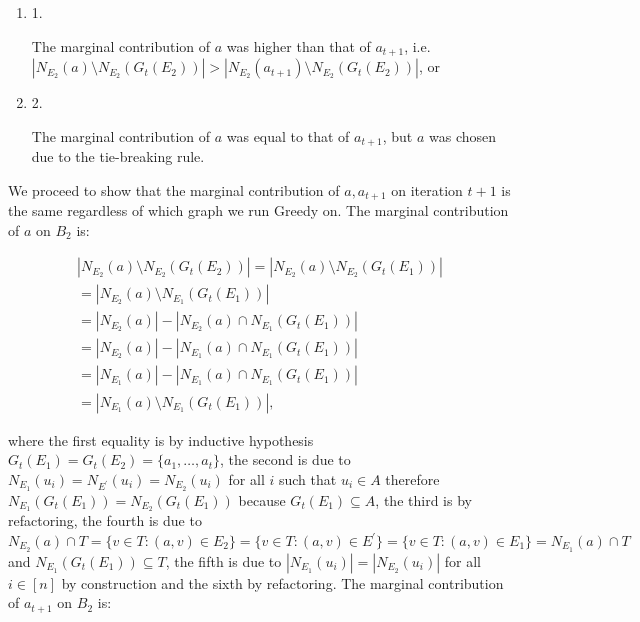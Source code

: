 \documentclass[10pt,a4paper]{article}
\begin{document}
\begin{enumerate}


\item[] 1. 


The marginal contribution of $a$ was higher than that of $a_{t+1}$, i.e. $|N_{E_{2}}(a)\setminus N_{E_{2}}(G_{t}(E_{2}))|>|N_{E_{2}}(a_{t+1})\setminus N_{E_{2}}(G_{t}(E_{2}))|$, or\par




\item[] 2. 


The marginal contribution of $a$ was equal to that of $a_{t+1}$, but $a$ was chosen due to the tie-breaking rule.\par




\end{enumerate}


We proceed to show that the marginal contribution of $a,a_{t+1}$ on iteration $t+1$ is the same regardless of which graph we run Greedy on. The marginal contribution of $a$ on $B_{2}$ is:\par


\[\begin{gathered}
\displaystyle|N_{E_{2}}(a)\setminus N_{E_{2}}(G_{t}(E_{2}))| \displaystyle=|N_{E_{2}}(a)\setminus N_{E_{2}}(G_{t}(E_{1}))| \\
\displaystyle=|N_{E_{2}}(a)\setminus N_{E_{1}}(G_{t}(E_{1}))| \\
\displaystyle=|N_{E_{2}}(a)|-|N_{E_{2}}(a)\cap N_{E_{1}}(G_{t}(E_{1}))| \\
\displaystyle=|N_{E_{2}}(a)|-|N_{E_{1}}(a)\cap N_{E_{1}}(G_{t}(E_{1}))| \\
\displaystyle=|N_{E_{1}}(a)|-|N_{E_{1}}(a)\cap N_{E_{1}}(G_{t}(E_{1}))| \\
\displaystyle=|N_{E_{1}}(a)\setminus N_{E_{1}}(G_{t}(E_{1}))|,
\end{gathered}\]


where the first equality is by inductive hypothesis $G_{t}(E_{1})=G_{t}(E_{2})=\{a_{1},\dots,a_{t}\}$, the second is due to $N_{E_{1}}(u_{i})=N_{E^{\prime}}(u_{i})=N_{E_{2}}(u_{i})$ for all $i$ such that $u_{i}\in A$ therefore $N_{E_{1}}(G_{t}(E_{1}))=N_{E_{2}}(G_{t}(E_{1}))$ because $G_{t}(E_{1})\subseteq A$, the third is by refactoring,
the fourth is due to $N_{E_{2}}(a)\cap T=\{v\in T:(a,v)\in E_{2}\}=\{v\in T:(a,v)\in E^{\prime}\}=\{v\in T:(a,v)\in E_{1}\}=N_{E_{1}}(a)\cap T$ and $N_{E_{1}}(G_{t}(E_{1}))\subseteq T$, the fifth is due to $|N_{E_{1}}(u_{i})|=|N_{E_{2}}(u_{i})|$ for all $i\in[n]$ by construction and the sixth by refactoring.
The marginal contribution of $a_{t+1}$ on $B_{2}$ is:\par
\end{document}
